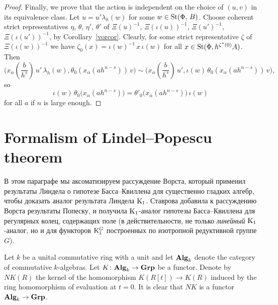 \documentclass[oneside, 11pt]{amsart} \pdfoutput=1
\begin{document}
\begin{proof}
Finally, we prove that the action is independent on the choice of $(u, v)$ in its equivalence class. Let $u = u' \lambda_h(w)$ for some $w \in \mathop{\mathrm{St}}\nolimits(\Phi,\,B)$. Choose coherent strict representatives $\eta$, $\theta$, $\eta'$, $\theta'$ of $\Xi(u)^{-1}$, $\Xi(\iota(u))^{-1}$, $\Xi(u')^{-1}$, $\Xi(\iota(u'))^{-1}$, by Corollary~\ref{vorcor}. Clearly, for some strict representative $\zeta$ of $\Xi(\iota(w))^{-1}$ we have $\zeta_0(x) = \iota(w)^{-1}\, x\, \iota(w)$ for all $x \in \mathop{\mathrm{St}}\nolimits(\Phi, h^{\zeta^*(0)} A)$.
Then
$$\textstyle
\bigl(x_\alpha(\frac b {h^s})\, u'\, \lambda_h(w), \theta_0(x_\alpha(ah^{n - s}))\, v\bigr) \sim \bigl(x_\alpha(\frac b {h^s})\, u', \iota(w)\, \theta_0(x_\alpha(ah^{n - s}))\, v\bigr),
$$
so
$$
\iota(w)\, \theta_0\bigl(x_\alpha(ah^{n-s})\bigr) = \theta'_0\bigl(x_\alpha(ah^{n-s})\bigr)\, \iota(w)
$$
for all \(a\) if \(n\) is large enough.
\end{proof}



\section{Formalism of Lindel--Popescu theorem}
В этом параграфе мы аксоматизируем рассуждение Ворста, который применил результаты Линдела о гипотезе Басса--Квиллена для существенно гладких алгебр, чтобы доказать аналог результата Линдела ${\mathrm{K}}_1$. Ставрова добавила к рассуждению Ворста результаты Попеску, и получила ${\mathrm{K}}_1$-аналог гипотезы Басса--Квиллена для регулярных колец, содержащих поле (в действительности, не только {\it линейный} ${\mathrm{K}}_1$-аналог, но и для функторов ${\mathrm{K}}_1^G$ построенных по изотропной редуктивной группе $G$).


Let $k$ be a unital commutative ring with a unit and let ${\normalfont\textbf{Alg}}_k$ denote the category of commutative $k$-algebras.
Let $K \colon {\normalfont\textbf{Alg}}_k \to {\normalfont\textbf{Grp}}$ be a functor. Denote by $NK(R)$ the kernel of the homomorphism $K(R[t]) \to K(R)$ induced by the ring homomorphism of evaluation at $t=0$. It is clear that $NK$ is a functor ${\normalfont\textbf{Alg}}_k \to {\normalfont\textbf{Grp}}$.
\end{document}
